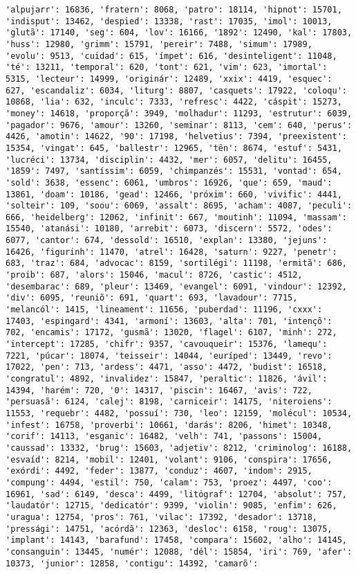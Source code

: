 \documentclass[11pt]{article}
\begin{document}
\begin{Verbatim}[commandchars=\\\{\}]
'alpujarr': 16836, 'fratern': 8068, 'patro': 18114, 'hipnot': 15701, 'indisput': 13462, 'despied': 13338, 'rast': 17035, 'imol': 10013, 'glutã': 17140, 'seg': 604, 'lov': 16166, '1892': 12490, 'kal': 17803, 'huss': 12980, 'grimm': 15791, 'pereir': 7488, 'simum': 17989, 'evolu': 9513, 'cuidad': 615, 'ímpet': 616, 'desinteligent': 11048, 'té': 13211, 'temporal': 620, 'tont': 621, 'vim': 623, 'imortal': 5315, 'lecteur': 14999, 'originár': 12489, 'xxix': 4419, 'esquec': 627, 'escandaliz': 6034, 'liturg': 8807, 'casquets': 17922, 'coloqu': 10868, 'lia': 632, 'inculc': 7333, 'refresc': 4422, 'cáspit': 15273, 'money': 14618, 'proporçã': 3949, 'molhadur': 11293, 'estrutur': 6039, 'pagador': 9676, 'amour': 13260, 'seminar': 8113, 'cem': 640, 'perus': 4426, 'amotin': 14622, '90': 17198, 'helvetius': 7394, 'preexistent': 15354, 'vingat': 645, 'ballestr': 12965, 'tên': 8674, 'estuf': 5431, 'lucréci': 13734, 'disciplin': 4432, 'mer': 6057, 'delitu': 16455, '1859': 7497, 'santíssim': 6059, 'chimpanzés': 15531, 'vontad': 654, 'sold': 3638, 'essenc': 6061, 'umbros': 16926, 'que': 659, 'maud': 13861, 'doam': 10186, 'gead': 12466, 'próxim': 660, 'vivific': 4441, 'solteir': 109, 'soou': 6069, 'assalt': 8695, 'acham': 4087, 'peculi': 666, 'heidelberg': 12062, 'infinit': 667, 'moutinh': 11094, 'massam': 15540, 'atanási': 10180, 'arrebit': 6073, 'discern': 5572, 'odes': 6077, 'cantor': 674, 'dessold': 16510, 'explan': 13380, 'jejuns': 16426, 'figurinh': 11470, 'atrel': 16428, 'saturn': 9227, 'penetr': 683, 'traz': 684, 'advocac': 8159, 'sortilégi': 11198, 'ermitã': 686, 'proib': 687, 'alors': 15046, 'macul': 8726, 'castic': 4512, 'desembarac': 689, 'pleur': 13469, 'evangel': 6091, 'vindour': 12392, 'div': 6095, 'reuniõ': 691, 'quart': 693, 'lavadour': 7715, 'melancól': 1415, 'lineament': 11656, 'puberdad': 11196, 'cxxx': 17403, 'espingard': 4341, 'armoní': 13603, 'alta': 701, 'intençõ': 702, 'encamis': 17172, 'gusmã': 13020, 'flagel': 6107, 'minh': 272, 'intercept': 17285, 'chifr': 9357, 'cavouqueir': 15376, 'lamequ': 7221, 'púcar': 18074, 'teisseir': 14044, 'euríped': 13449, 'revo': 17022, 'pen': 713, 'ardess': 4471, 'asso': 4472, 'budist': 16518, 'congratul': 4892, 'invalidez': 15847, 'peraltic': 11826, 'ávil': 14394, 'harém': 720, '0': 14317, 'piscin': 16467, 'avis': 722, 'persuasã': 6124, 'calej': 8198, 'carniceir': 14175, 'niteroiens': 11553, 'requebr': 4482, 'possuí': 730, 'leo': 12159, 'molécul': 10534, 'infest': 16758, 'proverbi': 10661, 'darás': 8206, 'himet': 10348, 'corif': 14113, 'esganic': 16482, 'velh': 741, 'passons': 15004, 'caussad': 13332, 'brug': 15603, 'adjetiv': 8212, 'criminolog': 16188, 'esvaíd': 8214, 'mobil': 12401, 'volant': 9106, 'conspira': 17656, 'exórdi': 4492, 'feder': 13877, 'conduz': 4607, 'indom': 2915, 'compung': 4494, 'estil': 750, 'calam': 753, 'proez': 4497, 'coo': 16961, 'sad': 6149, 'desca': 4499, 'litógraf': 12704, 'absolut': 757, 'laudatór': 12715, 'dedicatór': 9399, 'violin': 9085, 'enfim': 626, 'uragua': 12754, 'pros': 761, 'vilac': 17392, 'desador': 13718, 'pressági': 14751, 'acórdã': 12363, 'desloc': 6158, 'roug': 13075, 'implant': 14143, 'barafund': 17458, 'compara': 15602, 'alho': 14145, 'consanguin': 13445, 'numér': 12088, 'dél': 15854, 'iri': 769, 'afer': 10373, 'junior': 12858, 'contigu': 14392, 'camarõ': 
\end{Verbatim}
\end{document}

